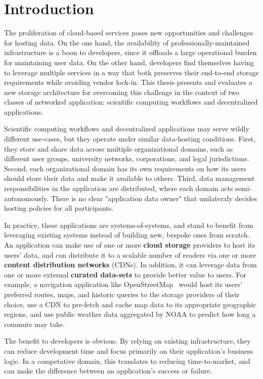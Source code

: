 \chapter{Introduction}
\label{chap:introduction}

The proliferation of cloud-based services poses new opportunities and
challenges for hosting data.  On the one hand, the availability of
professionally-maintained infrastructure is a boon to developers, since it
offloads a large operational burden for maintaining user data.  On the other
hand, developers find themselves having to leverage multiple services in a way
that both preserves their end-to-end storage requirements while
avoiding vendor lock-in.  This thesis presents and evaluates a new storage
architecture for overcoming this challenge in the context of two classes of
networked application: scientific computing workflows and decentralized
applications.

Scientific computing workflows and decentralized applications may
serve wildly different use-cases, but they operate under similar data-hosting
conditions.  First, they store and share data across multiple organizational
domains, such as different user groups, university networks, corporations, and
legal jurisdictions.  Second, each organizational domain has its own requirements
on how its users should store their data and make it available to others.  Third, data
management responsibilities in the application are distributed, where each
domain acts semi-autonomously.  There is no clear "application data owner" that unilateraly
decides hosting policies for all participants.

In practice, these applications are systems-of-systems, and stand to benefit
from leveraging existing systems instead of building new, bespoke ones from
scratch.  An application can make use of one or more \textbf{cloud storage}
providers to host its users' data,
and can distribute it to a scalable number of readers via one or more \textbf{content
distribution networks} (CDNs).  In addition, it can leverage data from
one or more external \textbf{curated data-sets} to provide better value to users.
For example, a navigation application like OpenStreetMap~\cite{openstreetmap} would host its users'
preferred routes, maps, and historic queries to the storage providers of their choice,
use a CDN to pre-fetch and cache map data to its appropriate geographic regions,
and use public weather data aggregated by NOAA to predict how long a commute may take.

The benefit to developers is obvious.  By relying on existing infrastructure,
they can reduce development time and focus primarily on their application's business
logic.  In a competative domain, this translates to reducing time-to-market,
and can make the difference between an application's success or failure.

